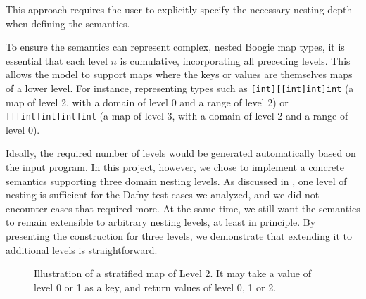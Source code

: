 This approach requires the user to explicitly specify the necessary nesting depth when defining the semantics.

To ensure the semantics can represent complex, nested Boogie map types,
it is essential that each level $n$ is cumulative, incorporating all preceding levels.
This allows the model to support maps where the keys or values are themselves maps of a lower level.
For instance, representing types such as
\lstinline[columns=fixed]{[int][[int]int]int} (a map of level 2, with a domain of level 0 and a range of level 2) or
\lstinline[columns=fixed]{[[[int]int]int]int} (a map of level 3, with a domain of level 2 and a range of level 0).

Ideally, the required number of levels would be generated automatically based on the input program.
In this project, however, we chose to implement a concrete semantics supporting three domain nesting levels.
As discussed in , one level of nesting is sufficient for the Dafny test cases we analyzed,
and we did not encounter cases that required more.
At the same time, we still want the semantics to remain extensible to arbitrary nesting levels, at least in principle.
By presenting the construction for three levels, we demonstrate that extending it to additional levels is straightforward.

\begin{figure}[t]
  \centering
  \caption{Illustration of a stratified map of Level 2.
  It may take a value of level 0 or 1 as a key,
  and return values of level 0, 1 or 2.}
  \label{fig:stratified-map-hierarchy}
\end{figure}



